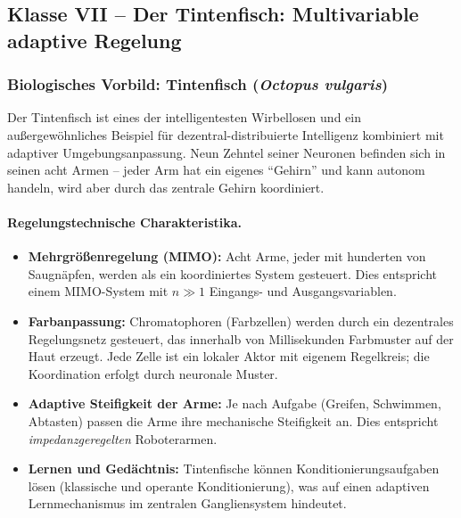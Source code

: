 \documentclass[a4paper,12pt]{article}
\theoremstyle{definition}
\begin{document}
\subsection{Klasse VII -- Der Tintenfisch: Multivariable adaptive Regelung}
\label{subsec:klasse_tintenfisch}

\subsubsection{Biologisches Vorbild: Tintenfisch (\textit{Octopus vulgaris})}

Der Tintenfisch ist eines der intelligentesten Wirbellosen und ein
außergewöhnliches Beispiel für dezentral-distribuierte Intelligenz kombiniert
mit adaptiver Umgebungsanpassung. Neun Zehntel seiner Neuronen befinden sich
in seinen acht Armen -- jeder Arm hat ein eigenes ``Gehirn'' und kann
autonom handeln, wird aber durch das zentrale Gehirn koordiniert.

\paragraph{Regelungstechnische Charakteristika.}
\begin{itemize}
	\item \textbf{Mehrgrößenregelung (MIMO):} Acht Arme, jeder mit hunderten
	von Saugnäpfen, werden als ein koordiniertes System gesteuert.
	Dies entspricht einem MIMO-System mit $n \gg 1$ Eingangs- und
	Ausgangsvariablen.
	\item \textbf{Farbanpassung:} Chromatophoren (Farbzellen) werden durch ein
	dezentrales Regelungsnetz gesteuert, das innerhalb von Millisekunden
	Farbmuster auf der Haut erzeugt. Jede Zelle ist ein lokaler
	Aktor mit eigenem Regelkreis; die Koordination erfolgt durch
	neuronale Muster.
	\item \textbf{Adaptive Steifigkeit der Arme:} Je nach Aufgabe (Greifen,
	Schwimmen, Abtasten) passen die Arme ihre mechanische Steifigkeit
	an. Dies entspricht \emph{impedanzgeregelten} Roboterarmen.
	\item \textbf{Lernen und Gedächtnis:} Tintenfische können Konditionierungsaufgaben
	lösen (klassische und operante Konditionierung), was auf einen
	adaptiven Lernmechanismus im zentralen Gangliensystem hindeutet.
\end{itemize}
\end{document}
